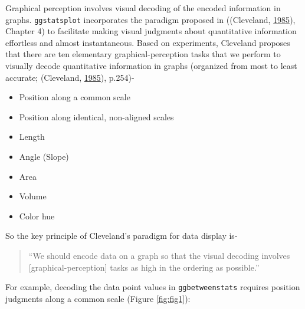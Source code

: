 \documentclass[
]{article}
\providecommand{\tightlist}{%
  \setlength{\itemsep}{0pt}\setlength{\parskip}{0pt}}
\begin{document}
Graphical perception involves visual decoding of the encoded information in
graphs. \texttt{ggstatsplot} incorporates the paradigm proposed in
((Cleveland, \protect\hyperlink{ref-clevelandElementsGraphingData1985}{1985}), Chapter 4) to facilitate making visual
judgments about quantitative information effortless and almost instantaneous.
Based on experiments, Cleveland proposes that there are ten elementary
graphical-perception tasks that we perform to visually decode quantitative
information in graphs (organized from most to least accurate;
(Cleveland, \protect\hyperlink{ref-clevelandElementsGraphingData1985}{1985}), p.254)-

\begin{itemize}
\tightlist
\item
  Position along a common scale
\item
  Position along identical, non-aligned scales
\item
  Length
\item
  Angle (Slope)
\item
  Area
\item
  Volume
\item
  Color hue
\end{itemize}

So the key principle of Cleveland's paradigm for data display is-

\begin{quote}
``We should encode data on a graph so that the visual decoding involves
{[}graphical-perception{]} tasks as high in the ordering as possible.''
\end{quote}

For example, decoding the data point values in \texttt{ggbetweenstats} requires
position judgments along a common scale (Figure \ref{fig:fig1}):
\end{document}

